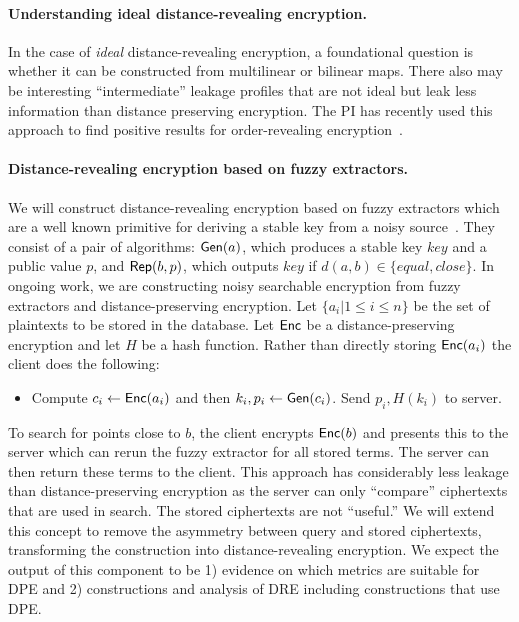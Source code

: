 \paragraph{Understanding ideal distance-revealing encryption.}
In the case of \emph{ideal} distance-revealing encryption, a foundational question is whether it can be constructed from multilinear or bilinear maps.  There also may be interesting ``intermediate'' leakage profiles that are not ideal but leak less information than distance preserving encryption.   The PI has recently used this approach to find positive results for order-revealing encryption~\cite{EPRINT:CLOZ16}.

\paragraph{Distance-revealing encryption based on fuzzy extractors.}
We will construct distance-revealing encryption based on fuzzy
extractors which are a well known primitive for deriving a stable key
from a noisy source~\cite{EC:DodReySmi04}.  They consist of a pair of
algorithms: $\mathsf{Gen}(a)$, which produces a stable key $key$ and a public
value $p$, and $\mathsf{Rep}(b, p)$, which outputs $key$ if $d(a,b)\in\{equal,close\}$.  In ongoing work, we are constructing noisy searchable encryption from fuzzy extractors and distance-preserving encryption.  Let $\{a_i | 1\le i \le n\}$ be the set of plaintexts to be stored in the database.  Let $\mathsf{Enc}$ be a distance-preserving encryption and let $H$ be a hash function.  Rather than directly storing $\mathsf{Enc}(a_i)$ the client does the following:

\begin{itemize}\setlength\itemsep{0em}
\item Compute $c_i \leftarrow \mathsf{Enc}(a_i)$ and then $k_i, p_i \leftarrow \mathsf{Gen}(c_i)$. Send $p_i, H(k_i)$ to server.
\end{itemize}

To search for points close to $b$, the client encrypts $\mathsf{Enc}(b)$ and presents this to the server which can rerun the fuzzy extractor for all stored terms.  The server can then return these terms to the client.  This approach has considerably less leakage than distance-preserving encryption as the server can only ``compare'' ciphertexts that are used in search.  The stored ciphertexts are not ``useful.''  We will extend this concept to remove the asymmetry between query and stored ciphertexts, transforming the construction into distance-revealing encryption.
We expect the output of this component to be 1) evidence on which metrics are suitable for DPE  and 2) constructions and analysis of DRE including constructions that use DPE.  

